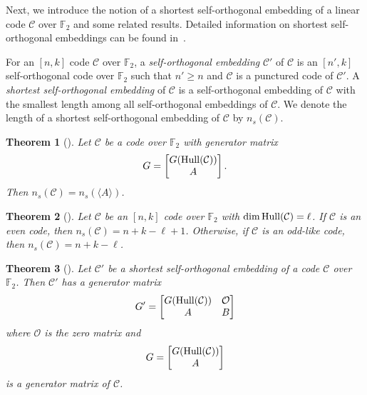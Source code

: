 \documentclass{article}
\newtheorem{theorem}{Theorem}[section]
\theoremstyle{definition}
\theoremstyle{remark}
\begin{document}
Next, we introduce the notion of a shortest self-orthogonal embedding of a linear code $\mathcal{C}$ over $\mathbb{F}_2$ and some related results. Detailed information on shortest self-orthogonal embeddings can be found in~\cite{AKKLW-arXiv}.

For an $[n, k]$ code $\mathcal{C}$ over $\mathbb{F}_2$, a \textit{self-orthogonal embedding} $\mathcal{C}'$ of $\mathcal{C}$ is an $[n', k]$ self-orthogonal code over $\mathbb{F}_2$ such that $n'\ge n$ and $\mathcal{C}$ is a punctured code of $\mathcal{C}'$. A \textit{shortest self-orthogonal embedding} of $\mathcal{C}$ is a self-orthogonal embedding of $\mathcal{C}$ with the smallest length among all self-orthogonal embeddings of $\mathcal{C}$. We denote the length of a shortest self-orthogonal embedding of $\mathcal{C}$ by $n_s(\mathcal{C})$.

\begin{theorem}[\cite{AKKLW-arXiv}]\label{shortestSOlcd}
    Let $\mathcal{C}$ be a code over $\mathbb{F}_2$ with generator matrix
    \[
     G=\begin{bmatrix}
        G({\rm Hull}(\mathcal{C}))\\A
    \end{bmatrix}.
    \]
    Then $n_s(\mathcal{C})=n_s(\langle A\rangle)$.
\end{theorem}

\begin{theorem}[\cite{AKKLW-arXiv}]\label{shortestSO}
    Let $\mathcal{C}$ be an $[n, k]$ code over $\mathbb{F}_2$ with $\dim{\rm{Hull}}(\mathcal{C})=\ell$. If $\mathcal{C}$ is an even code, then $n_s(\mathcal{C})=n+k-\ell+1$. Otherwise, if $\mathcal{C}$ is an odd-like code, then $n_s(\mathcal{C})=n+k-\ell$.
\end{theorem}

\begin{theorem}[\cite{AKKLW-arXiv}]\label{shortestSOgen}
    Let $\mathcal{C}'$ be a shortest self-orthogonal embedding of a code $\mathcal{C}$ over $\mathbb{F}_2$. Then $\mathcal{C}'$ has a generator matrix
    \[
    G'=\begin{bmatrix}
        G({\rm Hull}(\mathcal{C})) & \mathcal{O}\\A & B
    \end{bmatrix}
    \]
    where $\mathcal{O}$ is the zero matrix and \[
    G=\begin{bmatrix}
        G({\rm Hull}(\mathcal{C}))\\A
    \end{bmatrix}
    \]
    is a generator matrix of $\mathcal{C}$.
\end{theorem}
\end{document}
